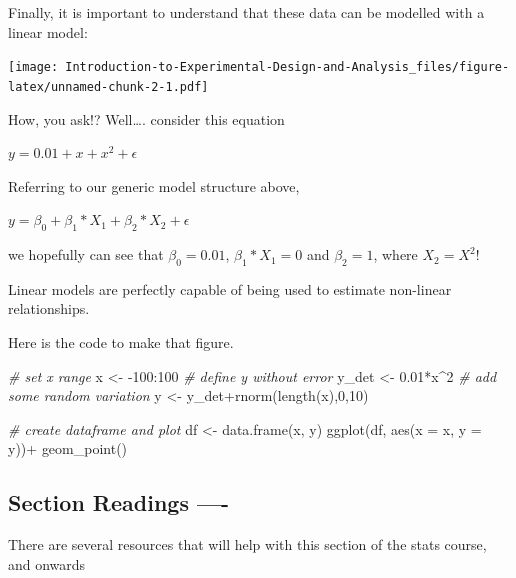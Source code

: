 \documentclass[
]{book}
\newenvironment{Shaded}{\begin{snugshade}}{\end{snugshade}}
\newcommand{\AttributeTok}[1]{\textcolor[rgb]{0.77,0.63,0.00}{#1}}
\newcommand{\CommentTok}[1]{\textcolor[rgb]{0.56,0.35,0.01}{\textit{#1}}}
\newcommand{\DecValTok}[1]{\textcolor[rgb]{0.00,0.00,0.81}{#1}}
\newcommand{\FloatTok}[1]{\textcolor[rgb]{0.00,0.00,0.81}{#1}}
\newcommand{\FunctionTok}[1]{\textcolor[rgb]{0.00,0.00,0.00}{#1}}
\newcommand{\NormalTok}[1]{#1}
\newcommand{\OtherTok}[1]{\textcolor[rgb]{0.56,0.35,0.01}{#1}}
\newcommand{\SpecialCharTok}[1]{\textcolor[rgb]{0.00,0.00,0.00}{#1}}
\begin{document}
Finally, it is important to understand that these data can be modelled with a linear model:

\texttt{[image: Introduction-to-Experimental-Design-and-Analysis\_files/figure-latex/unnamed-chunk-2-1.pdf]}

How, you ask!? Well\ldots. consider this equation

\(y = 0.01 + x + x^{2} + \epsilon\)

Referring to our generic model structure above,

\(y = \beta_{0}+\beta_{1}*X_{1}+\beta_{2}*X_{2}+\epsilon\)

we hopefully can see that \(\beta_{0} = 0.01\), \(\beta_{1}*X_{1} = 0\) and \(\beta_{2} = 1\), where \(X_{2} = X^{2}\)!

Linear models are perfectly capable of being used to estimate non-linear relationships.

Here is the code to make that figure.

\begin{Shaded}
\begin{Highlighting}[]
\CommentTok{\# set x range}
\NormalTok{x }\OtherTok{\textless{}{-}} \SpecialCharTok{{-}}\DecValTok{100}\SpecialCharTok{:}\DecValTok{100}
\CommentTok{\# define y without error}
\NormalTok{y\_det }\OtherTok{\textless{}{-}} \FloatTok{0.01}\SpecialCharTok{*}\NormalTok{x}\SpecialCharTok{\^{}}\DecValTok{2}
\CommentTok{\# add some random variation}
\NormalTok{y }\OtherTok{\textless{}{-}}\NormalTok{ y\_det}\SpecialCharTok{+}\FunctionTok{rnorm}\NormalTok{(}\FunctionTok{length}\NormalTok{(x),}\DecValTok{0}\NormalTok{,}\DecValTok{10}\NormalTok{)}

\CommentTok{\# create dataframe and plot}
\NormalTok{df }\OtherTok{\textless{}{-}} \FunctionTok{data.frame}\NormalTok{(x, y)}
\FunctionTok{ggplot}\NormalTok{(df, }\FunctionTok{aes}\NormalTok{(}\AttributeTok{x =}\NormalTok{ x, }\AttributeTok{y =}\NormalTok{ y))}\SpecialCharTok{+}
  \FunctionTok{geom\_point}\NormalTok{()}
\end{Highlighting}
\end{Shaded}

\hypertarget{section-readings--}{%
\subsection{Section Readings ----}\label{section-readings--}}

There are several resources that will help with this section of the stats course, and onwards
\end{document}
